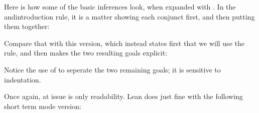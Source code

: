 \documentclass[letterpaper,10pt,english]{sphinxmanual}
\begin{document}
\sphinxAtStartPar
Here is how some of the basic inferences look, when expanded with . In the and\sphinxhyphen{}introduction rule, it is a matter showing each conjunct first, and then putting them together:

\begin{sphinxVerbatim}[commandchars=\\\{\}]
              
       
        
        
     
     
\end{sphinxVerbatim}

\sphinxAtStartPar
Compare that with this version, which instead states first that we will use the  rule, and then makes the two resulting goals explicit:

\begin{sphinxVerbatim}[commandchars=\\\{\}]
              
       
   
    
      
    
      
\end{sphinxVerbatim}

\sphinxAtStartPar
Notice the use of  to seperate the two remaining goals;
it is sensitive to indentation.

\sphinxAtStartPar
Once again, at issue is only readability.
Lean does just fine with the following short term mode version:

\begin{sphinxVerbatim}[commandchars=\\\{\}]
             
       
\end{sphinxVerbatim}
\end{document}
